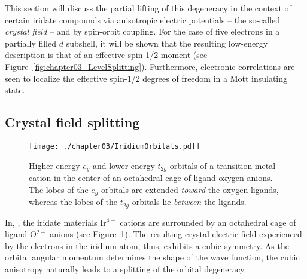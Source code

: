This section will discuss the partial lifting of this degeneracy in the context of certain iridate compounds via anisotropic electric potentials -- the so-called \textit{crystal field} -- and by spin-orbit coupling.
For the case of five electrons in a partially filled $d$ subshell, it will be shown that the resulting low-energy description is that of an effective spin-1/2 moment (see Figure~\ref{fig:chapter03_LevelSplitting}).
Furthermore, electronic correlations are seen to localize the effective spin-1/2 degrees of freedom in a Mott insulating state.


%
%
\subsection{Crystal field splitting}
%
%
%
\begin{figure}[tb]
	\centering
	\texttt{[image: ./chapter03/IridiumOrbitals.pdf]}
	\caption{
		Higher energy $e_g$ and lower energy $t_{2g}$ orbitals of a transition metal cation in the center of an octahedral cage of ligand oxygen anions.
		The lobes of the $e_g$ orbitals are extended \textit{toward} the oxygen ligands, whereas the lobes of the $t_{2g}$ orbitals lie \textit{between} the ligands.
	}
	\label{fig:chapter03_SpatialOrbitals}
\end{figure}
%
In, \eg, the iridate materials Ir$^{4+}$ cations are surrounded by an octahedral cage of ligand O$^{2-}$ anions (see Figure~\ref{fig:chapter03_SpatialOrbitals}).
The resulting crystal electric field experienced by the electrons in the iridium atom, thus, exhibits a cubic symmetry.
As the orbital angular momentum determines the shape of the wave function, the cubic anisotropy naturally leads to a splitting of the orbital degeneracy.

